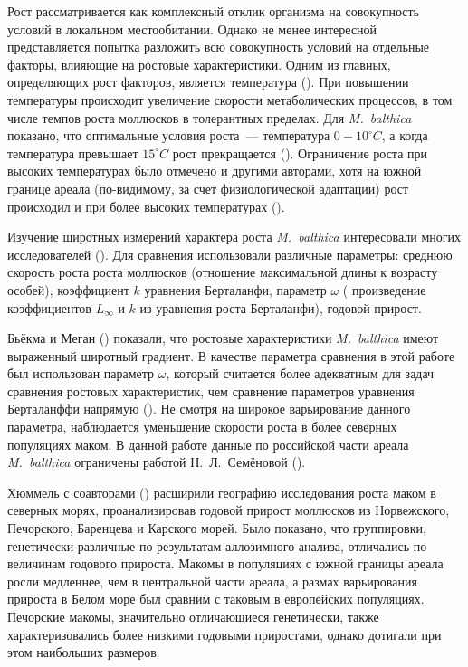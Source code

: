 Рост рассматривается как комплексный отклик организма на совокупность условий в локальном местообитании. 
Однако не менее интересной представляется попытка разложить всю совокупность условий на отдельные факторы, влияющие на ростовые характеристики. 
Одним из главных, определяющих рост факторов, является температура (\cite{Gilbert_1973, De_Wilde_1975, Bachelet_1980}). 
При повышении температуры происходит увеличение скорости метаболических процессов, в том числе темпов роста моллюсков в толерантных пределах.  
Для {\it M.~balthica} показано, что оптимальные условия роста~--- температура $0 - 10^{\circ} C$, а когда температура превышает $15^{\circ} C$ рост прекращается (\cite{De_Wilde_1975}). 
Ограничение роста при высоких температурах было отмечено и другими авторами, хотя на южной границе ареала (по-видимому, за счет физиологической адаптации) рост происходил и при более высоких температурах (\cite{Bachelet_1980}).

Изучение широтных измерений характера роста {\it M.~balthica} интересовали многих исследователей (\cite{Gilbert_1973, Bachelet_1980, Beukema_Meehan_1985, Wenne_Klusek_1985, Hummel_et_al_1998}).
Для сравнения использовали различные параметры: среднюю скорость роста роста моллюсков (отношение максимальной длины к возрасту особей), коэффициент $k$ уравнения Берталанфи, параметр $\omega$ ( произведение коэффициентов $L_{\infty}$ и $k$ из уравнения роста Берталанфи), годовой прирост.

Бьёкма и Меган (\cite{Beukema_Meehan_1985}) показали, что ростовые характеристики {\it M.~balthica} имеют выраженный широтный градиент.
В качестве параметра сравнения в этой работе был использован параметр $\omega$, который считается более адекватным для задач сравнения ростовых характеристик, чем сравнение параметров уравнения Берталанффи напрямую (\cite{Appeldoorn_1983}). 
Не смотря на широкое варьирование данного параметра, наблюдается уменьшение скорости роста в более северных популяциях маком.
В данной работе данные по российской части ареала {\it M.~balthica} ограничены работой Н.~Л.~Семёновой (\cite*{Semenova_1970}).

Хюммель с соавторами (\cite{Hummel_et_al_1998}) расширили географию исследования роста маком в северных морях, проанализировав годовой прирост моллюсков из Норвежского, Печорского, Баренцева и Карского морей.
Было показано, что группировки, генетически различные по результатам аллозимного анализа, отличались по величинам годового прироста. 
Макомы в популяциях с южной границы ареала росли медленнее, чем в центральной части ареала, а размах варьирования прироста в Белом море был сравним с таковым в европейских популяциях.
Печорские макомы, значительно отличающиеся генетически, также характеризовались более низкими годовыми приростами, однако дотигали при этом наибольших размеров.

